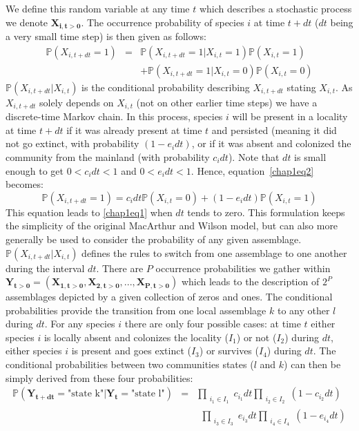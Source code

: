 We define this random variable at any time $t$ which describes a stochastic process we denote $\mathbf{X_{i,t>0}}$. The occurrence probability of species $i$ at time $t+dt$ ($dt$ being a very small time step) is then given as follows:
\begin{eqnarray}
\nonumber \mathbb{P}(X_{i,t+dt}=1) &=& \mathbb{P}(X_{i,t+dt}=1|X_{i,t}=1)\mathbb{P}(X_{i,t}=1) \\
\label{chap1eq2} & & +\mathbb{P}(X_{i,t+dt}=1|X_{i,t}=0)\mathbb{P}(X_{i,t}=0)
\end{eqnarray}
$\mathbb{P}(X_{i,t+dt}|X_{i,t})$ is the conditional probability describing $X_{i,t+dt}$ stating $X_{i,t}$. As $X_{i,t+dt}$ solely depends on $X_{i,t}$ (not on other earlier time steps) we have a discrete-time Markov chain. In this process, species $i$ will be present in a locality at time $t+dt$ if it was already present at time $t$ and persisted (meaning it did not go extinct, with probability $(1-e_idt)$, or if it was absent and colonized the community from the mainland (with probability $c_idt$). Note that $dt$ is small enough to get $0<c_idt<1$ and $0<e_idt<1$. Hence, equation~\eqref{chap1eq2} becomes:
\begin{equation}
\label{chap1eq3} \mathbb{P}(X_{i,t+dt}=1)=c_idt\mathbb{P}(X_{i,t}=0)+(1-e_idt)\mathbb{P}(X_{i,t}=1)
\end{equation}
This equation leads to \eqref{chap1eq1} when $dt$ tends to zero. This formulation keeps the simplicity of the original MacArthur and Wilson model, but can also more generally be used to consider the probability of any given assemblage. $\mathbb{P}(X_{i,t+dt}|X_{i,t})$ defines the rules to switch from one assemblage to one another during the interval $dt$.
There are $P$ occurrence probabilities we gather within $\mathbf{Y_{t>0}}=(\mathbf{X_{1,t>0}}, \mathbf{X_{2,t>0}}, ..., \mathbf{X_{P,t>0}})$ which leads to the description of $2^P$ assemblages depicted by a given collection of zeros and ones.
The conditional probabilities provide the transition from one local assemblage $k$ to any other $l$ during $dt$. For any species $i$ there are only four possible cases: at time $t$ either species $i$ is locally absent and colonizes the locality ($I_1$) or not ($I_2$) during $dt$, either species $i$ is present and goes extinct ($I_3$) or survives ($I_4$) during $dt$. The conditional probabilities between two communities states ($l$ and $k$) can then be simply derived from these four probabilities:
\begin{eqnarray}
 \nonumber \mathbb{P}(\mathbf{Y_{t+dt}}=\text{"state k"}| \mathbf{Y_{t}}=\text{"state l"}) &=& \prod_{\substack{i_1\in I_1}}c_{i_1}dt\prod_{\substack{i_2\in I_2}}(1-c_{i_2}dt)
\\  \label{chap1eq4} & &~~\prod_{\substack{i_3\in I_3}}e_{i_3}dt\prod_{\substack{i_4\in I_4}}(1-e_{i_4}dt)
\end{eqnarray}
